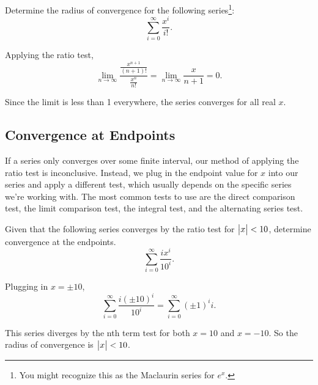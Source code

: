 \begin{example}
	Determine the radius of convergence for the following series\footnote{You might recognize this as the Maclaurin series for $e^x$.}:
	\begin{equation*}
		\sum_{i=0}^{\infty}{\frac{x^i}{i!}}.
	\end{equation*}
\end{example}
\begin{answer}
	Applying the ratio test,
	\begin{equation*}
		\lim_{n\to\infty}{\frac{\frac{x^{n+1}}{(n+1)!}}{\frac{x^n}{n!}}} = \lim_{n\to\infty}{\frac{x}{n+1}} = 0.
	\end{equation*}
	
	Since the limit is less than 1 everywhere, the series converges for all real $x$.
\end{answer}

\subsection{Convergence at Endpoints}
If a series only converges over some finite interval, our method of applying the ratio test is inconclusive.
Instead, we plug in the endpoint value for $x$ into our series and apply a different test, which usually depends on the specific series we're working with.
The most common tests to use are the direct comparison test, the limit comparison test, the integral test, and the alternating series test.

\begin{example}
	Given that the following series converges by the ratio test for $\big\lvert x \big\rvert<10$, determine convergence at the endpoints.
	\begin{equation*}
		\sum_{i=0}^{\infty}{\frac{ix^i}{10^i}}.
	\end{equation*}
\end{example}
\begin{answer}
	Plugging in $x=\pm10$,
	\begin{equation*}
		\sum_{i=0}^{\infty}{\frac{i(\pm10)^i}{10^i}} = \sum_{i=0}^{\infty}{(\pm 1)^i i}.
	\end{equation*}
	
	This series diverges by the nth term test for both $x=10$ and $x=-10$.
	So the radius of convergence is $\big\lvert x \big\rvert < 10$.
\end{answer}

